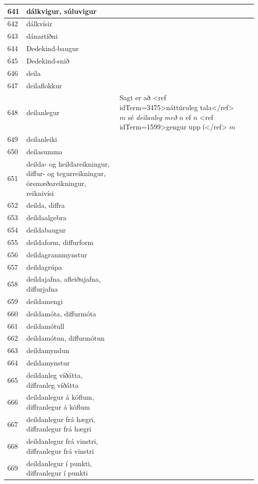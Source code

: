 \begin{longtable}{p{}|p{}|p{}|p{}|p{}}
\hline
641 & dálkvigur, súluvigur &  &  &  \\
\hline
642 & dálkvísir &  &  &  \\
\hline
643 & dánartíðni &  &  &  \\
\hline
644 & Dedekind-baugur &  &  &  \\
\hline
645 & Dedekind-snið &  &  &  \\
\hline
646 & deila &  &  &  \\
\hline
647 & deilaflokkur &  &  &  \\
\hline
648 & deilanlegur & Sagt er að <ref idTerm=3475>náttúruleg tala</ref> $m$ sé \textit{deilanleg með} $n$ ef $n$ <ref idTerm=1599>gengur upp í</ref> $m$ &  & \\
\hline
649 & deilanleiki &  &  &  \\
\hline
650 & deilasumma &  &  &  \\
\hline
651 & deilda- og heildareikningur, diffur- og tegurreikningur, örsmæðareikningur, reiknivísi &  &  &  \\
\hline
652 & deilda, diffra &  &  &  \\
\hline
653 & deildaalgebra &  &  &  \\
\hline
654 & deildabaugur &  &  &  \\
\hline
655 & deildaform, diffurform &  &  &  \\
\hline
656 & deildagrannmynstur &  &  &  \\
\hline
657 & deildagrúpa &  &  &  \\
\hline
658 & deildajafna, afleiðujafna, diffurjafna &  &  &  \\
\hline
659 & deildamengi &  &  &  \\
\hline
660 & deildamóta, diffurmóta &  &  &  \\
\hline
661 & deildamótull &  &  &  \\
\hline
662 & deildamótun, diffurmótun &  &  &  \\
\hline
663 & deildamyndun &  &  &  \\
\hline
664 & deildamynstur &  &  &  \\
\hline
665 & deildanleg víðátta, diffranleg víðátta &  &  &  \\
\hline
666 & deildanlegur á köflum, diffranlegur á köflum &  &  &  \\
\hline
667 & deildanlegur frá hægri, diffranlegur frá hægri &  &  &  \\
\hline
668 & deildanlegur frá vinstri, diffranlegur frá vinstri &  &  &  \\
\hline
669 & deildanlegur í punkti, diffranlegur í punkti &  &  &  \\

\end{longtable}
